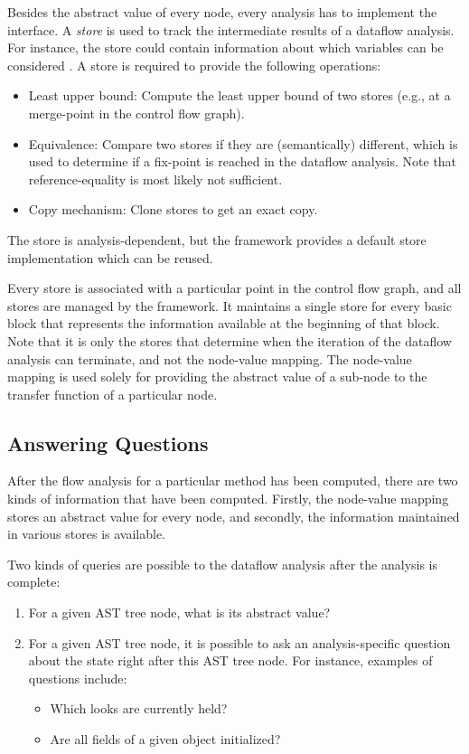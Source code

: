 Besides the abstract value of every node,
every analysis has to implement the  interface. A \emph{store} is
used to track the intermediate results of a dataflow analysis. For instance, the store
could contain information about which variables can be considered .
A store is required to provide the following operations:
\begin{itemize}
\item Least upper bound: Compute the least upper bound of two stores (e.g., at a merge-point
in the control flow graph).
\item Equivalence: Compare two stores if they are (semantically) different, which is used
to determine if a fix-point is reached in the dataflow analysis. Note that reference-equality
is most likely not sufficient.
\item Copy mechanism: Clone stores to get an exact copy.
\end{itemize}
The store is analysis-dependent, but the framework provides a default store implementation
which can be reused.

Every store is associated with a particular point in the control flow graph, and
all stores are managed by the framework. It maintains
a single store for every basic block that represents the information available at the
beginning of that block.
Note that it is only the stores that determine when the iteration of the dataflow analysis
can terminate, and not the node-value mapping.  The node-value mapping is used solely for
providing the abstract value of a sub-node to the transfer function of a particular node.


\subsection{Answering Questions}
After the flow analysis for a particular method has been computed, there are two kinds of
information that have been computed.  Firstly, the node-value mapping stores an abstract
value for every node, and secondly, the information maintained in various stores is
available.

Two kinds of queries are possible to the dataflow analysis after the analysis is complete:
\begin{enumerate}
    \item For a given AST tree node, what is its abstract value?
    \item For a given AST tree node, it is possible to ask an analysis-specific question
    about the state right after this AST tree node. For instance, examples of questions
    include:
    \begin{itemize}
        \item Which looks are currently held?
        \item Are all fields of a given object initialized?
    \end{itemize}
\end{enumerate}

